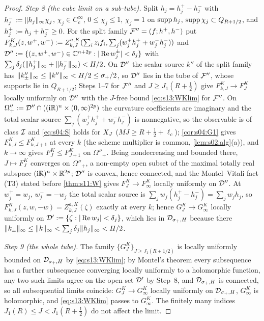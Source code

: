 \begin{proof}
\emph{Step 8 (the cube limit on a sub-tube).} Split $h_j=h_j^+-h_j^-$ with $h_j^-:=\lVert h_j\rVert_\infty\chi_j$, $\chi_j\in C^\infty_c$, $0\le\chi_j\le1$, $\chi_j=1$ on $\operatorname{supp} h_j$, $\operatorname{supp}\chi_j\subset Q_{R+1/2}$, and $h_j^+:= h_j+h_j^-\ge0$. For the split family $\mathcal F''=(f;h^+,h^-)$ put $F^K_{k,J}(z,w^+,w^-):= Z^{a,K}_{k,J}(\sum_iz_if_i,\sum_j(w_j^+h_j^++w_j^-h_j^-))$ and $\mathcal D'':=\{(z,w^+,w^-)\in\mathbb C^{n+2p}:|\operatorname{Re} w_j^\pm|<\delta_j\}$ with $\sum_j\delta_j(\lVert h_j^+\rVert_\infty+\lVert h_j^-\rVert_\infty)<H/2$. On $\mathcal D''$ the scalar source $k''$ of the split family has $\lVert k''_\pm\rVert_\infty\le\lVert k''\rVert_\infty<H/2\le\sigma_+/2$, so $\mathcal D''$ lies in the tube of $\mathcal F''$, whose supports lie in $Q_{R+1/2}$; Steps 1--7 for $\mathcal F''$ and $J\ge J_1(R+\frac12)$ give $F^K_{k,J}\to F^K_J$ locally uniformly on $\mathcal D''$ with the $J$-free bound \eqref{eq:s13:WKlim} for $\mathcal F''$. On $\Omega''_+:=\mathcal D''\cap((\mathrm i\mathbb R)^n\times(0,\infty)^{2p})$ the curvature coefficients are imaginary and the total scalar source $\sum_j(w_j^+h_j^++w_j^-h_j^-)$ is nonnegative, so the observable is of class $\mathcal I$ and \eqref{eq:s04:S} holds for $X_J$ ($MJ\ge R+\frac12+\ell_c$); \cref{cor:s04:G1} gives $F^K_{k,J}\le F^K_{k,J+1}$ at every $k$ (the scheme multiplier is common, \cref{lem:s02:alg}(a)), and $k\to\infty$ gives $F^K_J\le F^K_{J+1}$ on $\Omega''_+$. Being nondecreasing and bounded there, $J\mapsto F^K_J$ converges on $\Omega''_+$, a non-empty open subset of the maximal totally real subspace $(\mathrm i\mathbb R)^n\times\mathbb R^{2p}$; $\mathcal D''$ is convex, hence connected, and the Montel--Vitali fact (T3) stated before \cref{thm:s11:W} gives $F^K_J\to F^K_\infty$ locally uniformly on $\mathcal D''$. At $w^+_j=w_j$, $w^-_j=-w_j$ the total scalar source is $\sum_jw_j(h_j^+-h_j^-)=\sum_jw_jh_j$, so $F^K_{k,J}(z,w,-w)=Z^{a,K}_{k,J}(\zeta)$ exactly at every $k$; hence $G^K_J\to G^K_\infty$ locally uniformly on $\mathcal D':=\{\zeta:|\operatorname{Re} w_j|<\delta_j\}$, which lies in $\mathcal D_{\sigma_+,H}$ because there $\lVert k_\pm\rVert_\infty\le\lVert k\rVert_\infty<\sum_j\delta_j\lVert h_j\rVert_\infty<H/2$.

\emph{Step 9 (the whole tube).} The family $\{G^K_J\}_{J\ge J_1(R+1/2)}$ is locally uniformly bounded on $\mathcal D_{\sigma_+,H}$ by \eqref{eq:s13:WKlim}; by Montel's theorem every subsequence has a further subsequence converging locally uniformly to a holomorphic function, any two such limits agree on the open set $\mathcal D'$ by Step~8, and $\mathcal D_{\sigma_+,H}$ is connected, so all subsequential limits coincide: $G^K_J\to G^K_\infty$ locally uniformly on $\mathcal D_{\sigma_+,H}$, $G^K_\infty$ is holomorphic, and \eqref{eq:s13:WKlim} passes to $G^K_\infty$. The finitely many indices $J_1(R)\le J<J_1(R+\frac12)$ do not affect the limit.


\end{proof}
